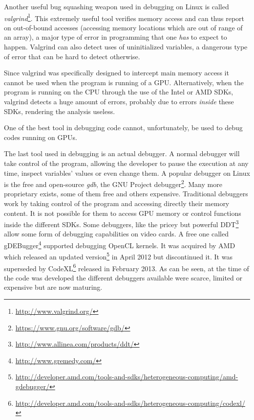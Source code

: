 \label{section:tools:opencl:valgrind}

Another useful bug squashing weapon used in debugging on Linux is called
\textit{valgrind}\footnote{\url{http://www.valgrind.org/}}. This extremely
useful tool verifies memory access and can thus report on out-of-bound accesses
(accessing memory locations which are out of range of an array), a major
type of error in programming that one \textit{has} to expect to happen.
Valgrind can also detect uses of uninitialized variables, a dangerous type of
error that can be hard to detect otherwise.

Since valgrind was specifically designed to intercept main memory access it
cannot be used when the program is running of a GPU. Alternatively, when the
program is running on the CPU through the use of the Intel or AMD SDKs, valgrind
detects a huge amount of errors, probably due to errors \textit{inside} these
SDKs, rendering the analysis useless.

One of the best tool in debugging code cannot, unfortunately, be used to debug
codes running on GPUs.



The last tool used in debugging is an actual debugger. A normal debugger will
take control of the program, allowing the developer to pause the execution
at any time, inspect variables' values or even change them. A popular debugger
on Linux is the free and open-source \textit{gdb}, the GNU Project
debugger\footnote{\url{https://www.gnu.org/software/gdb/}}. Many more
proprietary exists, some of them free and others expensive. Traditional
debuggers work by taking control of the program and accessing
directly their memory content. It is not possible for them to access GPU memory
or control functions inside the different SDKs. Some debuggers, like
the pricey but powerful DDT\footnote{\url{http://www.allinea.com/products/ddt/}}
allow some form of debugging capabilities on video cards. A free one
called gDEBugger\footnote{\url{http://www.gremedy.com/}} supported
debugging OpenCL kernels. It was acquired by AMD which released an updated
version\footnote{\url{http://developer.amd.com/tools-and-sdks/heterogeneous-computing/amd-gdebugger/}}
in April 2012 but discontinued it. It was superseded by
CodeXL\footnote{\url{http://developer.amd.com/tools-and-sdks/heterogeneous-computing/codexl/}}
released in February 2013. As can be seen, at the time of the code was developed
the different debuggers available were scarce, limited or expensive but are now
maturing.


